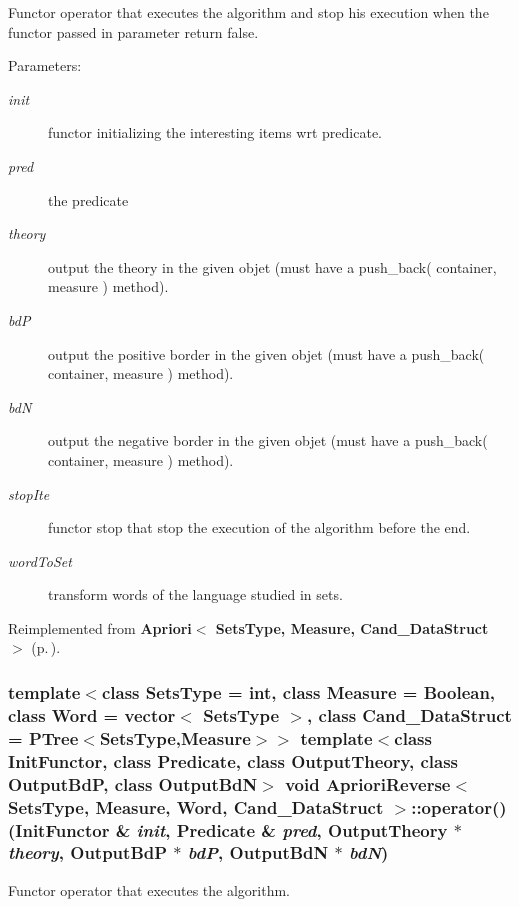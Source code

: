 Functor operator that executes the algorithm and stop his execution when the functor passed in parameter return false. 

\begin{Desc}
\item[Parameters:]
\begin{description}
\item[{\em init}]functor initializing the interesting items wrt predicate. \item[{\em pred}]the predicate \item[{\em theory}]output the theory in the given objet (must have a push\_\-back( container, measure ) method). \item[{\em bd\-P}]output the positive border in the given objet (must have a push\_\-back( container, measure ) method). \item[{\em bd\-N}]output the negative border in the given objet (must have a push\_\-back( container, measure ) method). \item[{\em stop\-Ite}]functor stop that stop the execution of the algorithm before the end. \item[{\em word\-To\-Set}]transform words of the language studied in sets. \end{description}
\end{Desc}


Reimplemented from {\bf Apriori$<$ Sets\-Type, Measure, Cand\_\-Data\-Struct $>$} {\rm (p.\,\pageref{class_apriori_4ccc3fe5ae7ecaa9efffcdc41d1888ed})}.
\subsubsection{\setlength{\rightskip}{0pt plus 5cm}template$<$class Sets\-Type = int, class Measure = Boolean, class Word = vector$<$ Sets\-Type $>$, class Cand\_\-Data\-Struct = PTree$<$Sets\-Type,Measure$>$$>$ template$<$class Init\-Functor, class Predicate, class Output\-Theory, class Output\-Bd\-P, class Output\-Bd\-N$>$ void {\bf Apriori\-Reverse}$<$ Sets\-Type, Measure, Word, Cand\_\-Data\-Struct $>$::operator() (Init\-Functor \& {\em init}, {\bf Predicate} \& {\em pred}, Output\-Theory $\ast$ {\em theory}, Output\-Bd\-P $\ast$ {\em bd\-P}, Output\-Bd\-N $\ast$ {\em bd\-N})\hspace{0.3cm}{\tt  [inline]}}\label{class_apriori_reverse_5266cde8d5a9455c9f9281e435754ca9}


Functor operator that executes the algorithm. 

